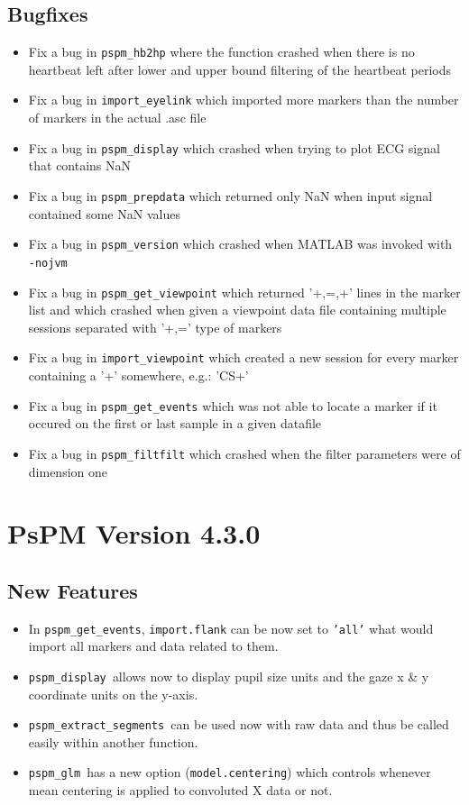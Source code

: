 \documentclass[english]{article}
\numberwithin{equation}{section}
\numberwithin{figure}{section}
\begin{document}
\subsection*{Bugfixes}
\begin{itemize}
\item Fix a bug in \texttt{pspm\_hb2hp} where the function crashed when
there is no heartbeat left after lower and upper bound filtering of
the heartbeat periods
\item Fix a bug in \texttt{import\_eyelink} which imported more markers
than the number of markers in the actual .asc file
\item Fix a bug in \texttt{pspm\_display} which crashed when trying to plot
ECG signal that contains NaN
\item Fix a bug in \texttt{pspm\_prepdata} which returned only NaN when
input signal contained some NaN values
\item Fix a bug in \texttt{pspm\_version} which crashed when MATLAB was
invoked with \texttt{-nojvm}
\item Fix a bug in \texttt{pspm\_get\_viewpoint} which returned '+,=,+'
lines in the marker list and which crashed when given a viewpoint
data file containing multiple sessions separated with '+,=' type of
markers
\item Fix a bug in \texttt{import\_viewpoint} which created a new session
for every marker containing a '+' somewhere, e.g.: 'CS+'
\item Fix a bug in \texttt{pspm\_get\_events} which was not able to locate
a marker if it occured on the first or last sample in a given datafile
\item Fix a bug in \texttt{pspm\_filtfilt} which crashed when the filter
parameters were of dimension one
\end{itemize}

\section{PsPM Version 4.3.0}

\subsection*{New Features}
\begin{itemize}
\item In \texttt{pspm\_get\_events}, \texttt{import.flank} can be now set
to \texttt{'all'} what would import all markers and data related to
them.
\item \texttt{pspm\_display }allows now to display pupil size units and
the gaze x \& y coordinate units on the y-axis.
\item \texttt{pspm\_extract\_segments }can be used now with raw data and
thus be called easily within another function.
\item \texttt{pspm\_glm }has a new option (\texttt{model.centering}) which
controls whenever mean centering is applied to convoluted X data or
not.
\end{itemize}
\end{document}
